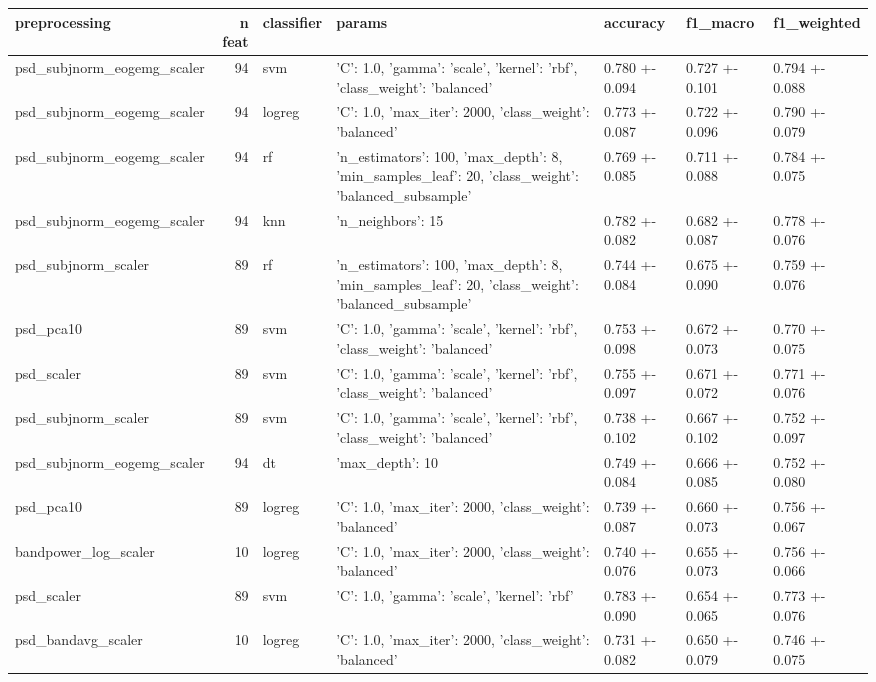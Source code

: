 \begin{tabular}{lrlllll}
\toprule
preprocessing & n feat & classifier & params & accuracy & f1_macro & f1_weighted \\
\midrule
psd_subjnorm_eogemg_scaler & 94 & svm & {'C': 1.0, 'gamma': 'scale', 'kernel': 'rbf', 'class_weight': 'balanced'} & 0.780 +- 0.094 & 0.727 +- 0.101 & 0.794 +- 0.088 \\
psd_subjnorm_eogemg_scaler & 94 & logreg & {'C': 1.0, 'max_iter': 2000, 'class_weight': 'balanced'} & 0.773 +- 0.087 & 0.722 +- 0.096 & 0.790 +- 0.079 \\
psd_subjnorm_eogemg_scaler & 94 & rf & {'n_estimators': 100, 'max_depth': 8, 'min_samples_leaf': 20, 'class_weight': 'balanced_subsample'} & 0.769 +- 0.085 & 0.711 +- 0.088 & 0.784 +- 0.075 \\
psd_subjnorm_eogemg_scaler & 94 & knn & {'n_neighbors': 15} & 0.782 +- 0.082 & 0.682 +- 0.087 & 0.778 +- 0.076 \\
psd_subjnorm_scaler & 89 & rf & {'n_estimators': 100, 'max_depth': 8, 'min_samples_leaf': 20, 'class_weight': 'balanced_subsample'} & 0.744 +- 0.084 & 0.675 +- 0.090 & 0.759 +- 0.076 \\
psd_pca10 & 89 & svm & {'C': 1.0, 'gamma': 'scale', 'kernel': 'rbf', 'class_weight': 'balanced'} & 0.753 +- 0.098 & 0.672 +- 0.073 & 0.770 +- 0.075 \\
psd_scaler & 89 & svm & {'C': 1.0, 'gamma': 'scale', 'kernel': 'rbf', 'class_weight': 'balanced'} & 0.755 +- 0.097 & 0.671 +- 0.072 & 0.771 +- 0.076 \\
psd_subjnorm_scaler & 89 & svm & {'C': 1.0, 'gamma': 'scale', 'kernel': 'rbf', 'class_weight': 'balanced'} & 0.738 +- 0.102 & 0.667 +- 0.102 & 0.752 +- 0.097 \\
psd_subjnorm_eogemg_scaler & 94 & dt & {'max_depth': 10} & 0.749 +- 0.084 & 0.666 +- 0.085 & 0.752 +- 0.080 \\
psd_pca10 & 89 & logreg & {'C': 1.0, 'max_iter': 2000, 'class_weight': 'balanced'} & 0.739 +- 0.087 & 0.660 +- 0.073 & 0.756 +- 0.067 \\
bandpower_log_scaler & 10 & logreg & {'C': 1.0, 'max_iter': 2000, 'class_weight': 'balanced'} & 0.740 +- 0.076 & 0.655 +- 0.073 & 0.756 +- 0.066 \\
psd_scaler & 89 & svm & {'C': 1.0, 'gamma': 'scale', 'kernel': 'rbf'} & 0.783 +- 0.090 & 0.654 +- 0.065 & 0.773 +- 0.076 \\
psd_bandavg_scaler & 10 & logreg & {'C': 1.0, 'max_iter': 2000, 'class_weight': 'balanced'} & 0.731 +- 0.082 & 0.650 +- 0.079 & 0.746 +- 0.075 \\

\end{tabular}
